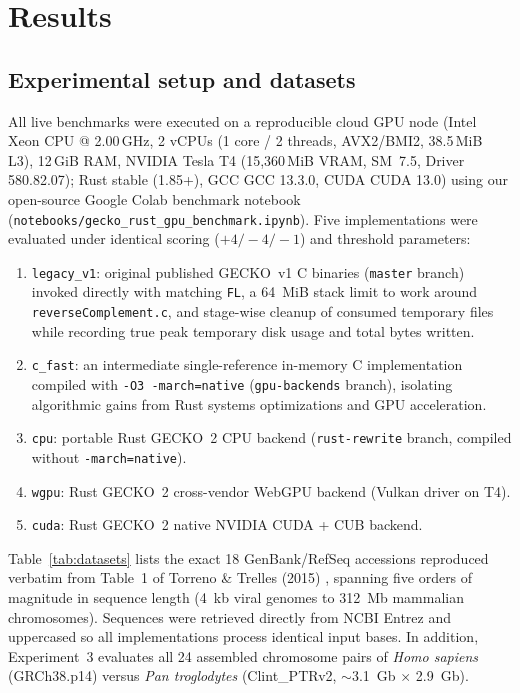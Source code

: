 \documentclass[pdflatex,sn-vancouver,Numbered]{sn-jnl}
\makeatletter
\newcommand{\hwCpu}{Intel Xeon CPU @ 2.00\,GHz, 2 vCPUs (1 core / 2 threads, AVX2/BMI2, 38.5\,MiB L3)}
\newcommand{\hwRam}{12\,GiB RAM}
\newcommand{\hwGpu}{NVIDIA Tesla T4 (15,360\,MiB VRAM, SM~7.5, Driver 580.82.07)}
\newcommand{\hwRustc}{stable (1.85+)}
\newcommand{\hwGcc}{GCC 13.3.0}
\newcommand{\hwNvcc}{CUDA 13.0}
\makeatother
\begin{document}
\section{Results}\label{sec:results}

\subsection{Experimental setup and datasets}\label{subsec:setup}

All live benchmarks were executed on a reproducible cloud GPU node (\hwCpu{}, \hwRam{}, \hwGpu{}; Rust \hwRustc{}, GCC \hwGcc{}, CUDA \hwNvcc{}) using our open-source Google Colab benchmark notebook (\texttt{notebooks/gecko\_rust\_gpu\_benchmark.ipynb}). Five implementations were evaluated under identical scoring ($+4/-4/-1$) and threshold parameters:
\begin{enumerate}
    \item \texttt{legacy\_v1}: original published GECKO~v1 C binaries (\texttt{master} branch) invoked directly with matching \texttt{FL}, a 64~MiB stack limit to work around \texttt{reverseComplement.c}, and stage-wise cleanup of consumed temporary files while recording true peak temporary disk usage and total bytes written.
    \item \texttt{c\_fast}: an intermediate single-reference in-memory C implementation compiled with \texttt{-O3 -march=native} (\texttt{gpu-backends} branch), isolating algorithmic gains from Rust systems optimizations and GPU acceleration.
    \item \texttt{cpu}: portable Rust GECKO~2 CPU backend (\texttt{rust-rewrite} branch, compiled without \texttt{-march=native}).
    \item \texttt{wgpu}: Rust GECKO~2 cross-vendor WebGPU backend (Vulkan driver on T4).
    \item \texttt{cuda}: Rust GECKO~2 native NVIDIA CUDA + CUB backend.
\end{enumerate}

Table~\ref{tab:datasets} lists the exact 18 GenBank/RefSeq accessions reproduced verbatim from Table~1 of Torreno \& Trelles (2015) \cite{torreno2015gecko}, spanning five orders of magnitude in sequence length (4~kb viral genomes to 312~Mb mammalian chromosomes). Sequences were retrieved directly from NCBI Entrez and uppercased so all implementations process identical input bases. In addition, Experiment~3 evaluates all 24 assembled chromosome pairs of \textit{Homo sapiens} (GRCh38.p14) versus \textit{Pan troglodytes} (Clint\_PTRv2, $\sim$3.1~Gb $\times$ 2.9~Gb).
\end{document}
